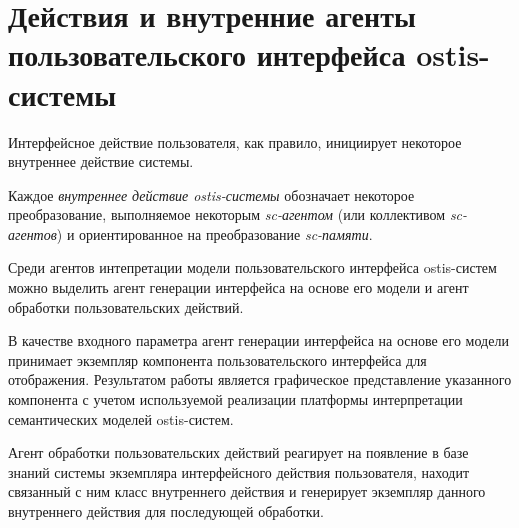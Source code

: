 \section{Действия и внутренние агенты пользовательского интерфейса ostis-системы}

Интерфейсное действие пользователя, как правило, инициирует некоторое внутреннее действие системы. 


	
Каждое \textit{внутреннее действие ostis-системы} обозначает некоторое преобразование, выполняемое некоторым \textit{sc-агентом} (или коллективом \textit{sc-агентов}) и ориентированное на преобразование \textit{sc-памяти}.


\bigskip
Среди агентов интепретации модели пользовательского интерфейса ostis-систем можно выделить агент генерации интерфейса на основе его модели и агент обработки пользовательских действий.

В качестве входного параметра агент генерации интерфейса на основе его модели принимает экземпляр компонента пользовательского интерфейса для отображения. Результатом работы является графическое представление указанного компонента с учетом используемой реализации платформы интерпретации семантических моделей ostis-систем.

Агент обработки пользовательских действий реагирует на появление в базе знаний системы экземпляра интерфейсного действия пользователя, находит связанный с ним класс внутреннего действия и генерирует экземпляр данного внутреннего действия для последующей обработки.


%
